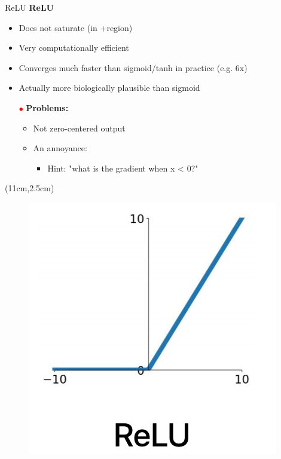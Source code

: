 \documentclass[serif, aspectratio=169]{beamer}
\begin{document}
\begin{frame}{ReLU}
	\textbf{ReLU}
	\begin{itemize}
		\item Does not saturate (in +region)
		\item Very computationally efficient
		\item Converges much faster than sigmoid/tanh \newline in practice (e.g. 6x)
		\item Actually more biologically plausible than sigmoid
		\item[\textcolor{red}{$\bullet$}] \color{red} \textbf{Problems:}
		\begin{itemize}
			\item \color{red} Not zero-centered output
			\item \color{red} An annoyance:
			\begin{itemize}
				\item \color{red} Hint: "what is the gradient when x < 0?"
			\end{itemize}
		\end{itemize}
	\end{itemize}
	\begin{textblock*}{5cm}(11cm,2.5cm) %
		\begin{figure}[htbp]
			\begin{center}
				\includegraphics[keepaspectratio, scale=0.3]{pic/ReLU}
			\end{center}
		\end{figure}
	\end{textblock*}
\end{frame}
\end{document}
